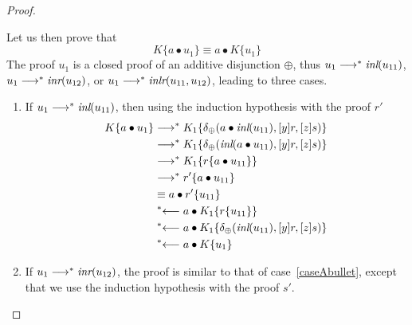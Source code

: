 \documentclass[screen, sigconf,authorversion,nonacm]{acmart}
\theoremstyle{acmdefinition}
\numberwithin{equation}{section}
\newcommand\abstr[1]{[#1]}
\newcommand\inl{\mbox{\it inl}}
\newcommand\inr{\mbox{\it inr}}
\newcommand\inlr{\mbox{\it inlr}}
\newcommand\lra{\longrightarrow}
\newcommand\lras{\lra^*}
\newcommand\llas{\mathrel{{}^*{\longleftarrow}}}
\newcommand\elimplus{\delta_{\oplus}}
\begin{document}
\begin{proof}
\begin{itemize}
\begin{itemize}
          Let us then prove that 
          $$K\{a \bullet u_1\} \equiv a \bullet K\{u_1\}$$ The proof
          $u_1$ is a closed proof of an additive disjunction $\oplus$,
          thus $u_1 \lras \inl(u_{11})$, $u_1 \lras \inr(u_{12})$, or
          $u_1 \lras \inlr(u_{11},u_{12})$, leading to three cases.

          \begin{enumerate}
          \item\label{caseAbullet} If $u_1 \lras \inl(u_{11})$, then using the
              induction hypothesis with the proof $r'$
	  \begin{align*}
	    K\{a \bullet u_1\}
	    &\lras K_1 \{\elimplus(a \bullet \inl(u_{11}),\abstr{y}r,\abstr{z}s)\}\\
	    &\lras K_1 \{\elimplus(\inl(a \bullet u_{11}), \abstr{y}r,\abstr{z}s)\}\\
	    &\lras K_1 \{r\{a \bullet u_{11}\}\}\\
            &\lras r'\{a \bullet u_{11}\}\\
            & \equiv a \bullet r'\{u_{11}\}\\
	    &\llas a \bullet  K_1 \{r\{u_{11}\}\}\\
            &\llas a \bullet K_1 \{\elimplus(\inl(u_{11}),\abstr{y}r,\abstr{z}s)\}\\
	   & \llas a \bullet K\{u_1\}
	  \end{align*}
          
          \item If $u_1 \lras \inr(u_{12})$, 
 the proof is similar to that of case~\eqref{caseAbullet}, except that we use the
 induction hypothesis with the proof $s'$.


\end{enumerate}
\end{itemize}
\end{itemize}
\end{proof}
\end{document}
